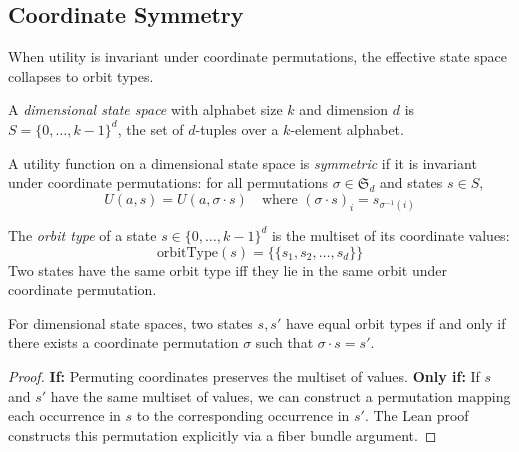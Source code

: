\subsection{Coordinate Symmetry}\label{sec:tract-symmetry}

When utility is invariant under coordinate permutations, the effective state space collapses to orbit types.

\begin{definition}\label{def:dimensional}
A \emph{dimensional state space} with alphabet size $k$ and dimension $d$ is $S = \{0, \ldots, k-1\}^d$, the set of $d$-tuples over a $k$-element alphabet.
\end{definition}

\begin{definition}\label{def:symmetric}
A utility function on a dimensional state space is \emph{symmetric} if it is invariant under coordinate permutations: for all permutations $\sigma \in \mathfrak{S}_d$ and states $s \in S$,
\[
U(a, s) = U(a, \sigma \cdot s) \quad \text{where } (\sigma \cdot s)_i = s_{\sigma^{-1}(i)}
\]
\end{definition}

\begin{definition}\label{def:orbit-type}
The \emph{orbit type} of a state $s \in \{0, \ldots, k-1\}^d$ is the multiset of its coordinate values:
\[
\text{orbitType}(s) = \{\!\{s_1, s_2, \ldots, s_d\}\!\}
\]
Two states have the same orbit type iff they lie in the same orbit under coordinate permutation.
\end{definition}

\begin{theorem}\label{thm:orbit-type}
For dimensional state spaces, two states $s, s'$ have equal orbit types if and only if there exists a coordinate permutation $\sigma$ such that $\sigma \cdot s = s'$.
\end{theorem}

\begin{proof}
\textbf{If:} Permuting coordinates preserves the multiset of values.
\textbf{Only if:} If $s$ and $s'$ have the same multiset of values, we can construct a permutation mapping each occurrence in $s$ to the corresponding occurrence in $s'$. The Lean proof constructs this permutation explicitly via a fiber bundle argument.
\end{proof}

